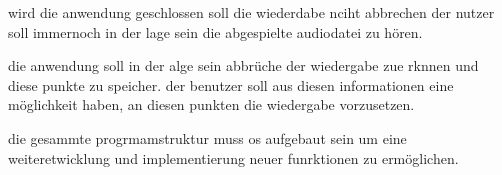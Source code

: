 wird die anwendung geschlossen soll die wiederdabe nciht abbrechen der nutzer soll immernoch in der lage sein die abgespielte audiodatei zu hören.

die anwendung soll in der alge sein abbrüche der wiedergabe zue rknnen und diese punkte zu speicher. der benutzer soll aus diesen informationen eine möglichkeit haben, an diesen punkten die wiedergabe vorzusetzen.

die gesammte progrmamstruktur muss os aufgebaut sein um eine weiteretwicklung und implementierung neuer funrktionen zu ermöglichen.
